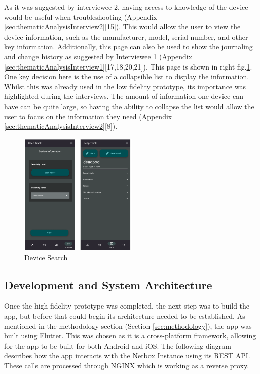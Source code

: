 \documentclass [11pt,a4paper]{article}
\begin{document}
As it was suggested by interviewee 2, having access to knowledge of the device would be useful when troubleshooting (Appendix \ref{sec:thematicAnalysisInterview2}[15]). This would allow the user to view the device information, such as the manufacturer, model, serial number, and other key information. Additionally, this page can also be used to show the journaling and change history as suggested by Interviewee 1 (Appendix \ref{sec:thematicAnalysisInterview1}[17,18,20,21]). This page is shown in right fig.\ref{fig:device_search}. One key decision here is the use of a collapsible list to display the information. Whilst this was already used in the low fidelity prototype, its importance was highlighted during the interviews. The amount of information one device can have can be quite large, so having the ability to collapse the list would allow the user to focus on the information they need (Appendix \ref{sec:thematicAnalysisInterview2}[8]). 

\begin{figure}[H]
    \centering
    \includegraphics[width=0.5\textwidth]{images/device_info.png}
    \caption{Device Search}
    \label{fig:device_search}
\end{figure}



\subsection{Development and System Architecture}
\label{sec:development} 
Once the high fidelity prototype was completed, the next step was to build the app, but before that could begin its architecture needed to be established. As mentioned in the methodology section (Section \ref{sec:methodology}), the app was built using Flutter. This was chosen as it is a cross-platform framework, allowing for the app to be built for both Android and iOS. The following diagram describes how the app interacts with the Netbox Instance using its REST API. These calls are processed through NGINX which is working as a reverse proxy.
\end{document}

